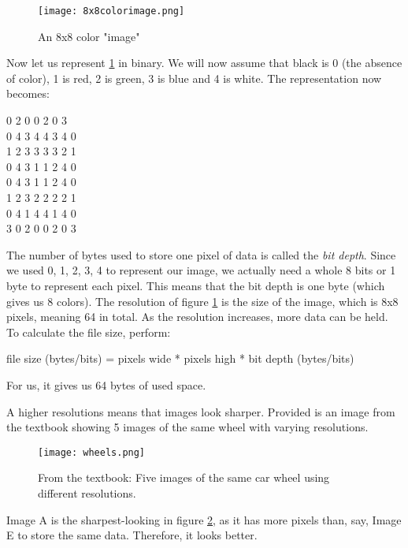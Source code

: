 \documentclass[../main.tex]{subfiles}
\begin{document}
\medskip
\begin{figure}[H]
    \centering
    \texttt{[image: 8x8colorimage.png]}
    \caption{An 8x8 color "image"}
    \label{fig:8x8colorimage}
\end{figure}

Now let us represent \ref{fig:8x8colorimage} in binary. We will now assume that black is 0 (the absence of color), 1 is red, 2 is green, 3 is blue and 4 is white. The representation now becomes:

\newpage 

{\mono{} 0 2 0 0 2 0 3\\
    0 4 3 4 4 3 4 0\\
    1 2 3 3 3 3 2 1\\
    0 4 3 1 1 2 4 0\\
    0 4 3 1 1 2 4 0\\
    1 2 3 2 2 2 2 1\\
    0 4 1 4 4 1 4 0\\
    3 0 2 0 0 2 0 3\\
}

\medskip

The number of bytes used to store one pixel of data is called the \emph{bit depth}. Since we used 0, 1, 2, 3, 4 to represent our image, we actually need a whole 8 bits or 1 byte to represent each pixel. This means that the bit depth is one byte (which gives us 8 colors). The resolution of figure \ref{fig:8x8colorimage} is the size of the image, which is 8x8 pixels, meaning 64 in total. As the resolution increases, more data can be held. To calculate the file size, perform:

{\centering\mono
file size (bytes/bits) = pixels wide * pixels high * bit depth (bytes/bits)
}

For us, it gives us 64 bytes of used space.

A higher resolutions means that images look sharper. Provided is an image from the textbook showing 5 images of the same wheel with varying resolutions. 

\begin{figure}[H]
    \centering
    \texttt{[image: wheels.png]}
    \caption{From the textbook: Five images of the same car wheel using different resolutions.}
    \label{fig:wheel}
\end{figure}

Image A is the sharpest-looking in figure \ref{fig:wheel}, as it has more pixels than, say, Image E to store the same data. Therefore, it looks better.
\end{document}
